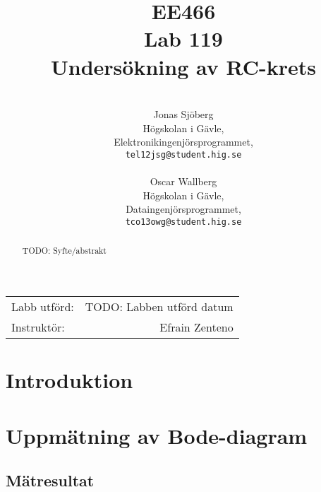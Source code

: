\documentclass[11pt,a4paper]{article}
\title{EE466 \\ Lab 119 \\ Undersökning av RC-krets}
\author{\\
  Jonas Sjöberg\\
  Högskolan i Gävle,\\
  Elektronikingenjörsprogrammet,\\
  \texttt{tel12jsg@student.hig.se}\\
  \\
  Oscar Wallberg\\
  Högskolan i Gävle,\\
  Dataingenjörsprogrammet,\\
  \texttt{tco13owg@student.hig.se}\\}
\date{}
\begin{document}
\maketitle

\begin{center}
    \begin{tabular}{l r}
        Labb utförd: & TODO: Labben utförd datum \\
        Instruktör: & Efrain Zenteno
    \end{tabular}
\end{center}

\begin{abstract}
    TODO: Syfte/abstrakt
\end{abstract}

\newpage

{
    \setcounter{tocdepth}{3}
    \tableofcontents
}

\newpage

\section{Introduktion}\label{setup}


\section{Uppmätning av Bode-diagram}\label{}

\subsection{Mätresultat}\label{}
\end{document}
